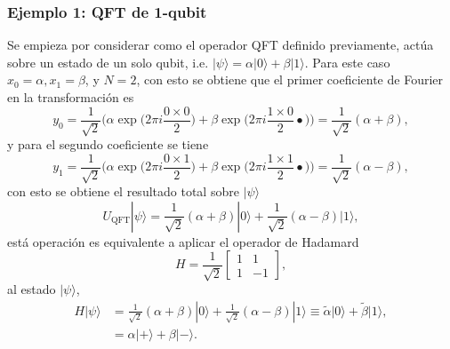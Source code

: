 \documentclass[a4paper]{article}
\begin{document}
\subsubsection{Ejemplo 1: QFT de 1-qubit}
Se empieza por considerar como el operador QFT definido previamente, actúa sobre  un estado de un solo qubit, i.e. $|\psi\rangle=\alpha|0\rangle+\beta |1\rangle$. Para este caso $x_0=\alpha, x_1=\beta$, y $N=2$, con esto se obtiene
que el primer coeficiente de Fourier en la transformación es 
\begin{equation}
y_0=\frac{1}{\sqrt{2}}\Bigg( \alpha \exp\bigg( 2\pi i \frac{0\times 0}{2} \bigg) + \beta \exp\bigg( 2\pi i \frac{1\times 0}{2}{•} \bigg) \Bigg)=\frac{1}{\sqrt{2}}(\alpha+\beta),
\end{equation}
y para el segundo coeficiente se tiene
\begin{equation}
y_1=\frac{1}{\sqrt{2}}\Bigg( \alpha \exp\bigg( 2\pi i \frac{0\times 1}{2} \bigg) + \beta \exp\bigg( 2\pi i \frac{1\times 1}{2}{•} \bigg) \Bigg)=\frac{1}{\sqrt{2}}(\alpha-\beta),
\end{equation}
con esto se obtiene el resultado total sobre $|\psi\rangle$
\begin{equation}
U_{\text{QFT}}|\psi\rangle=\frac{1}{\sqrt{2}}(\alpha+\beta)|0\rangle + \frac{1}{\sqrt{2}}(\alpha-\beta)|1\rangle,
\end{equation}
está operación es equivalente a aplicar el operador de Hadamard
\begin{equation}\label{eq::Hadamard_gate}
H=\frac{1}{\sqrt{2}}
\begin{bmatrix}
1&1\\
1&-1
\end{bmatrix},
\end{equation}
al estado $\vert \psi\rangle$, 
\begin{equation}
\begin{aligned}
H\vert\psi\rangle&=\frac{1}{\sqrt{2}}(\alpha+\beta)|0\rangle + \frac{1}{\sqrt{2}}(\alpha-\beta)|1\rangle\equiv \tilde{\alpha}\vert 0\rangle+ \tilde{\beta}\vert 1\rangle,\\
&=\alpha \vert + \rangle +\beta \vert - \rangle.
\end{aligned}
\end{equation}
\end{document}
